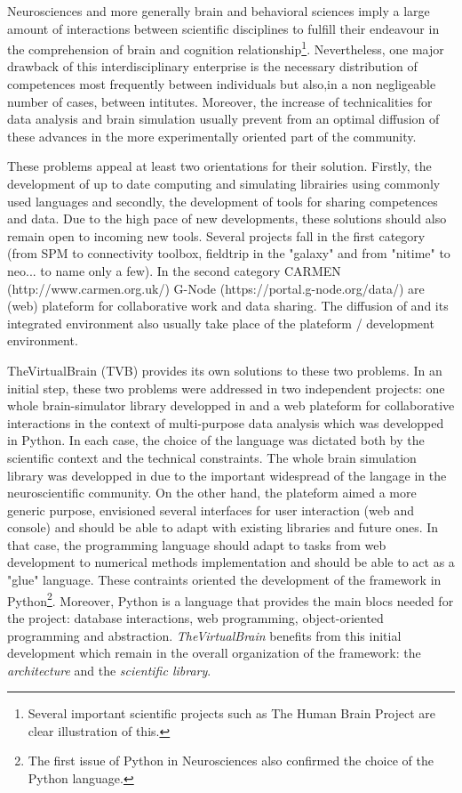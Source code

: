 Neurosciences and more generally brain and behavioral sciences imply a large
amount of interactions between scientific disciplines to fulfill their endeavour
in the comprehension of brain and cognition relationship\footnote{Several
    important scientific projects such as The Human Brain Project are clear
illustration of this.}. Nevertheless, one major drawback of this
interdisciplinary enterprise is the necessary distribution of competences most
frequently between individuals but also,in a non negligeable number of cases,
between intitutes.  Moreover, the increase of technicalities for data
analysis and brain simulation usually prevent from an optimal diffusion of these
advances in the more experimentally oriented part of the community. 

These problems appeal at least two orientations for their solution. Firstly,  the
development of up to date computing and simulating librairies using commonly
used languages and secondly, the development of tools for sharing
competences and data. Due to the high pace of new developments, these solutions
should also remain open to incoming new tools. Several projects fall in the
first category (from SPM to connectivity toolbox, fieldtrip in the \matlab{} "galaxy"
and from "nitime" to neo... to name only a few). In the second category CARMEN
(http://www.carmen.org.uk/) G-Node (https://portal.g-node.org/data/)
 are (web) plateform for collaborative work and data
sharing. The diffusion of \matlab{} and its integrated environment also usually
take place of the plateform / development environment.

TheVirtualBrain (TVB) provides its own solutions to these two problems.  In an
initial step, these two problems were addressed in two independent projects: one
whole brain-simulator library developped in \matlab{} and a web plateform for
collaborative interactions in the context of multi-purpose data analysis which
was developped in Python.  In each case, the choice of the language was dictated
both by the scientific context and the technical constraints. The whole brain
simulation library was developped in \matlab{} due to the 
important widespread of the langage in the neuroscientific community. On the
other hand, the plateform aimed a more generic purpose, envisioned several
interfaces for user interaction (web and console) and should be able to adapt
with existing libraries and future ones. In that case, the programming language
should adapt to tasks from  web development to numerical methods implementation
and should be able to act as a "glue" language. These contraints
 oriented the development of the framework in
Python\footnote{The first issue of Python in Neurosciences also confirmed the
choice of the Python language.}.  Moreover, Python is a language that provides
the main blocs needed for the project: database interactions, web programming,
object-oriented programming and abstraction. \emph{TheVirtualBrain} benefits
from this initial development which remain in the overall organization of the
framework: the \emph{architecture} and the \emph{scientific library}.

